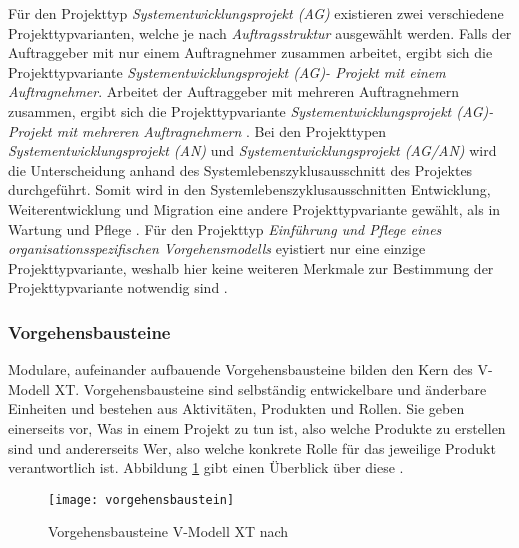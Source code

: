 Für den Projekttyp \textit{Systementwicklungsprojekt (AG)} existieren zwei verschiedene Projekttypvarianten, welche je nach \textit{Auftragsstruktur} ausgewählt werden. Falls der Auftraggeber mit nur einem Auftragnehmer zusammen arbeitet, ergibt sich die Projekttypvariante \textit{Systementwicklungsprojekt (AG)- Projekt mit einem Auftragnehmer}. Arbeitet der Auftraggeber mit mehreren Auftragnehmern zusammen, ergibt sich die Projekttypvariante \textit{Systementwicklungsprojekt (AG)- Projekt mit mehreren Auftragnehmern} \cite{2004vmodell}.\newline
Bei den Projekttypen \textit{Systementwicklungsprojekt (AN)} und \textit{Systementwicklungsprojekt (AG/AN)} wird die Unterscheidung anhand des Systemlebenszyklusausschnitt des Projektes durchgeführt. Somit wird in den Systemlebenszyklusausschnitten Entwicklung, Weiterentwicklung und Migration eine andere Projekttypvariante gewählt, als in Wartung und Pflege \cite{2004vmodell}.\newline 
Für den Projekttyp \textit{Einführung und Pflege eines organisationsspezifischen Vorgehensmodells} eyistiert nur eine einzige Projekttypvariante, weshalb hier keine weiteren Merkmale zur Bestimmung der Projekttypvariante notwendig sind \cite{2004vmodell}.\newline

  
 \subsubsection{Vorgehensbausteine}
Modulare, aufeinander aufbauende Vorgehensbausteine bilden den Kern des V-Modell XT. Vorgehensbausteine sind selbständig entwickelbare und änderbare Einheiten und bestehen aus Aktivitäten, Produkten und Rollen. Sie geben einerseits vor, \grqq Was\grqq{}  in einem Projekt zu tun ist, also welche Produkte zu erstellen sind und andererseits \grqq Wer\grqq, also welche konkrete Rolle für das jeweilige Produkt verantwortlich ist. Abbildung \ref{fig:vorgehensbausteine} gibt einen Überblick über diese \cite{ruf2008, 2004vmodell}.\newline

\begin{figure}[htp]
\begin{center}
  \texttt{[image: vorgehensbaustein]} %
  \caption{Vorgehensbausteine V-Modell XT nach \cite{2004vmodell}}
  \label{fig:vorgehensbausteine}
\end{center}
\end{figure}

